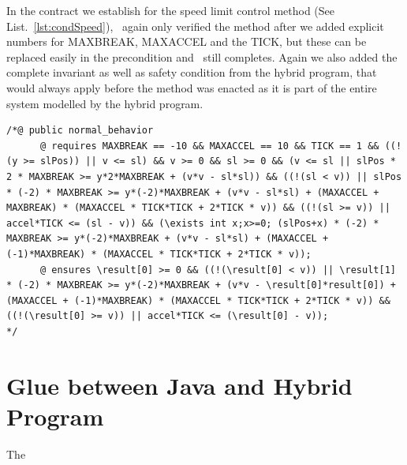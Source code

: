 In the contract we establish for the speed limit control method (See List.~\ref{lst:condSpeed}), \key~again only verified the method after we added explicit numbers for MAXBREAK, MAXACCEL and the TICK, but these can be replaced easily in the precondition and \key~still completes. Again we also added the complete invariant as well as safety condition from the hybrid program, that would always apply before the method was enacted as it is part of the entire system modelled by the hybrid program.

\begin{lstlisting}[label=lst:condSpeed]
/*@ public normal_behavior
	  @ requires MAXBREAK == -10 && MAXACCEL == 10 && TICK == 1 && ((!(y >= slPos)) || v <= sl) && v >= 0 && sl >= 0 && (v <= sl || slPos * 2 * MAXBREAK >= y*2*MAXBREAK + (v*v - sl*sl)) && ((!(sl < v)) || slPos * (-2) * MAXBREAK >= y*(-2)*MAXBREAK + (v*v - sl*sl) + (MAXACCEL + MAXBREAK) * (MAXACCEL * TICK*TICK + 2*TICK * v)) && ((!(sl >= v)) || accel*TICK <= (sl - v)) && (\exists int x;x>=0; (slPos+x) * (-2) * MAXBREAK >= y*(-2)*MAXBREAK + (v*v - sl*sl) + (MAXACCEL + (-1)*MAXBREAK) * (MAXACCEL * TICK*TICK + 2*TICK * v));
	  @ ensures \result[0] >= 0 && ((!(\result[0] < v)) || \result[1] * (-2) * MAXBREAK >= y*(-2)*MAXBREAK + (v*v - \result[0]*result[0]) + (MAXACCEL + (-1)*MAXBREAK) * (MAXACCEL * TICK*TICK + 2*TICK * v)) && ((!(\result[0] >= v)) || accel*TICK <= (\result[0] - v));
*/
\end{lstlisting}

\section{Glue between Java and Hybrid Program}
\label{sec:traffic:glue}

The 
